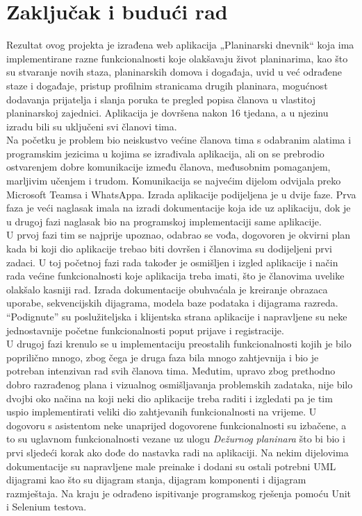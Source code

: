 \chapter{Zaključak i budući rad}
		
		Rezultat ovog projekta je izrađena web aplikacija  „Planinarski dnevnik“ koja ima implementirane razne funkcionalnosti koje olakšavaju život planinarima, kao što su stvaranje novih staza, planinarskih domova i događaja, uvid u već odrađene staze i događaje, pristup profilnim stranicama drugih planinara, mogućnost dodavanja prijatelja i slanja poruka te pregled popisa članova u vlastitoj planinarskoj zajednici. Aplikacija je dovršena nakon 16 tjedana, a u njezinu izradu bili su uključeni svi članovi tima.\\
		Na početku je problem bio neiskustvo većine članova tima  s odabranim alatima i programskim jezicima u kojima se izrađivala aplikacija, ali on se prebrodio ostvarenjem dobre komunikacije između članova, međusobnim pomaganjem, marljivim učenjem i trudom. Komunikacija se najvećim dijelom odvijala preko Microsoft Teamsa  i WhatsAppa. Izrada aplikacije podijeljena je u dvije faze. Prva faza je veći naglasak imala na izradi dokumentacije koja ide uz aplikaciju, dok je u drugoj fazi naglasak bio na programskoj implementaciji same aplikacije.\\ 
		U prvoj fazi tim se najprije upoznao, odabrao se vođa, dogovoren je okvirni plan kada bi koji dio aplikacije trebao biti dovršen i članovima su dodijeljeni prvi zadaci. U toj početnoj fazi rada također je osmišljen i izgled aplikacije i način rada većine funkcionalnosti koje aplikacija treba imati, što je članovima uvelike olakšalo kasniji rad. Izrada dokumentacije obuhvaćala je kreiranje obrazaca uporabe, sekvencijskih dijagrama, modela baze podataka i dijagrama razreda. “Podignute” su poslužiteljska i klijentska strana aplikacije  i napravljene su neke jednostavnije početne funkcionalnosti poput prijave i registracije.\\
		U drugoj fazi  krenulo se u implementaciju preostalih funkcionalnosti kojih je bilo poprilično mnogo, zbog čega je druga faza bila mnogo zahtjevnija i bio je potreban intenzivan rad svih članova tima. Međutim, upravo zbog prethodno dobro razrađenog plana i vizualnog osmišljavanja problemskih zadataka, nije bilo dvojbi oko načina na koji neki dio aplikacije treba raditi i izgledati pa je tim uspio implementirati veliki dio zahtjevanih funkcionalnosti na vrijeme. U dogovoru s asistentom neke unaprijed dogovorene funkcionalnosti su izbačene, a to su uglavnom funkcionalnosti vezane uz ulogu \textit{Dežurnog planinara} što bi bio i prvi sljedeći korak ako dođe do nastavka radi na aplikaciji. Na nekim dijelovima dokumentacije su napravljene male preinake i dodani su ostali potrebni UML dijagrami kao što su dijagram stanja, dijagram komponenti i dijagram razmještaja. Na kraju je odrađeno ispitivanje programskog rješenja pomoću Unit i Selenium testova.\\
		 
